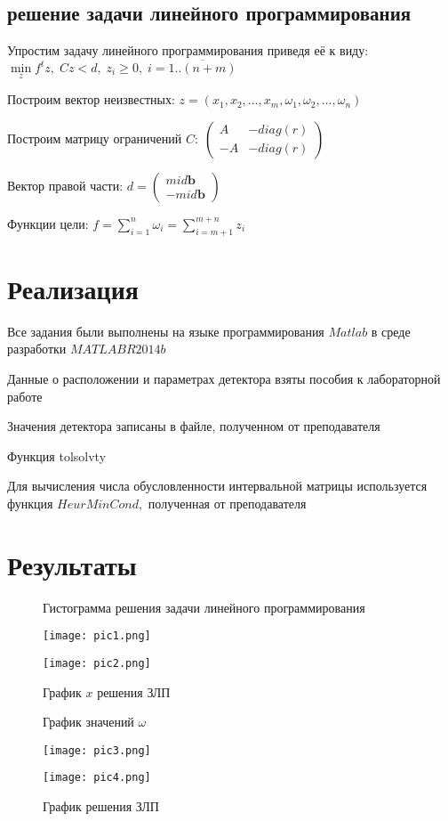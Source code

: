 \documentclass[a4]{article}
\begin{document}
\subsection{решение задачи линейного программирования}
Упростим задачу линейного программирования приведя её к виду:  $\min\limits_zf^tz,\; Cz<d,\;z_i\geq0,\;i=\overline{1..(n+m)}$

Построим вектор неизвестных: $z=(x_1,x_2,\ldots,x_m,\omega_1,\omega_2,\ldots,\omega_n)$

Построим матрицу ограничений $C:\;\begin{pmatrix}
A & -diag(r)\\
-A & -diag(r)
\end{pmatrix}$

Вектор правой части: $d=\begin{pmatrix}
mid \mathbf{b}\\
-mid \mathbf{b}
\end{pmatrix}$

Функции цели: $f=\sum\limits_{i=1}^n\omega_i=\sum\limits_{i=m+1}^{m+n}z_i$
\section{Реализация}
Все задания были выполнены на языке программирования $Matlab$ в среде разработки $MATLAB R2014b$ \hfill \cite{1}

Данные о расположении и параметрах детектора взяты пособия к лабораторной работе \hfill\cite{source2}

Значения детектора записаны в файле, полученном от преподавателя

Функция tolsolvty \hfill \cite{tolsolvty}

Для вычисления числа обусловленности интервальной матрицы используется функция $HeurMinCond,$ полученная от преподавателя

\section{Результаты}

\begin{figure}[H]
\begin{center}
\caption{Гистограмма решения задачи линейного программирования}
\texttt{[image: pic1.png]} 
\caption{График $x$ решения ЗЛП}
\texttt{[image: pic2.png]}
\end{center}
\end{figure}
\begin{figure}[H]
\begin{center}
\caption{График значений $\omega$}
\texttt{[image: pic3.png]} 
\caption{График решения ЗЛП}
\texttt{[image: pic4.png]}
\end{center}
\end{figure}
\end{document}
